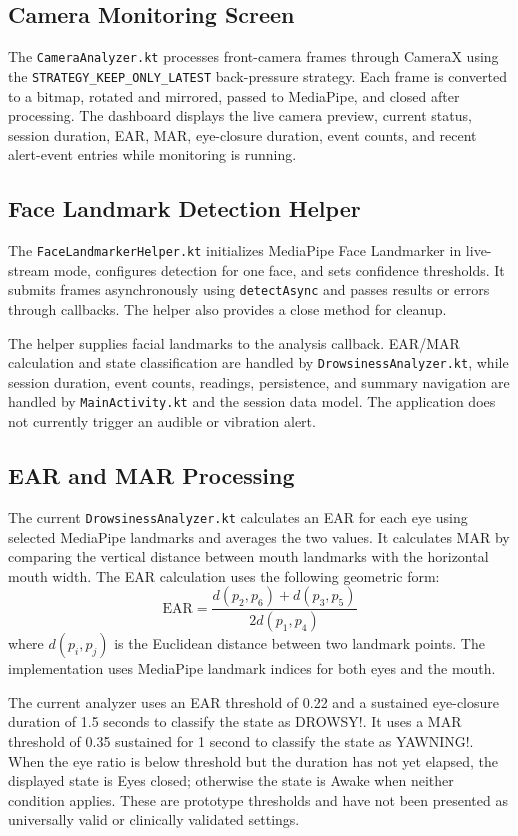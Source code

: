 \documentclass{tietreport}
\begin{document}
\subsection{Camera Monitoring Screen}
The \texttt{CameraAnalyzer.kt} processes front-camera frames through CameraX using the \texttt{STRATEGY\_KEEP\_ONLY\_LATEST} back-pressure strategy. Each frame is converted to a bitmap, rotated and mirrored, passed to MediaPipe, and closed after processing. The dashboard displays the live camera preview, current status, session duration, EAR, MAR, eye-closure duration, event counts, and recent alert-event entries while monitoring is running.

\subsection{Face Landmark Detection Helper}
The \texttt{FaceLandmarkerHelper.kt} initializes MediaPipe Face Landmarker in live-stream mode, configures detection for one face, and sets confidence thresholds. It submits frames asynchronously using \texttt{detectAsync} and passes results or errors through callbacks. The helper also provides a close method for cleanup.

The helper supplies facial landmarks to the analysis callback. EAR/MAR calculation and state classification are handled by \texttt{DrowsinessAnalyzer.kt}, while session duration, event counts, readings, persistence, and summary navigation are handled by \texttt{MainActivity.kt} and the session data model. The application does not currently trigger an audible or vibration alert.

\subsection{EAR and MAR Processing}
The current \texttt{DrowsinessAnalyzer.kt} calculates an EAR for each eye using selected MediaPipe landmarks and averages the two values. It calculates MAR by comparing the vertical distance between mouth landmarks with the horizontal mouth width. The EAR calculation uses the following geometric form:
\[
\mathrm{EAR} =
\frac{d(p_2,p_6)+d(p_3,p_5)}
{2d(p_1,p_4)}
\]
where \(d(p_i,p_j)\) is the Euclidean distance between two landmark points. The implementation uses MediaPipe landmark indices for both eyes and the mouth.

The current analyzer uses an EAR threshold of 0.22 and a sustained eye-closure duration of 1.5 seconds to classify the state as DROWSY!. It uses a MAR threshold of 0.35 sustained for 1 second to classify the state as YAWNING!. When the eye ratio is below threshold but the duration has not yet elapsed, the displayed state is Eyes closed; otherwise the state is Awake when neither condition applies. These are prototype thresholds and have not been presented as universally valid or clinically validated settings.
\end{document}
